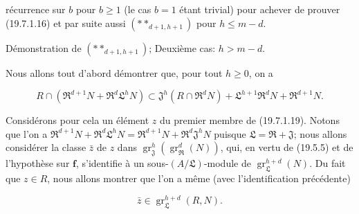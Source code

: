 
récurrence sur $b$ pour $b\geq1$ (le cas $b=1$ étant trivial) pour achever de prouver (19.7.1.16) et par suite aussi $(**_{d+1,h+1})$ pour $h\leq m-d$.

\begin{env}[19.7.1.18]
\label{IV.19.7.1.18}
Démonstration de $(**_{d+1,h+1})$; Deuxième cas: $h>m-d$.
\end{env}

Nous allons tout d'abord démontrer que, pour tout $h\geq0$, on a
\begin{env}[19.7.1.19]
\label{IV.19.7.1.19}
\[
  R\cap(\mathfrak R^{d+1}N+\mathfrak R^d\mathfrak L^hN)\subset\mathfrak J^h(R\cap\mathfrak R^dN)+\mathfrak L^{h+1}\mathfrak R^dN+\mathfrak R^{d+1}N.
\]
\end{env}

Considérons pour cela un élément $z$ du premier membre de (19.7.1.19). Notons que l'on a $\mathfrak R^{d+1}N+\mathfrak R^d\mathfrak L^hN=\mathfrak R^{d+1}N+\mathfrak R^d\mathfrak J^hN$ puisque $\mathfrak L=\mathfrak R+\mathfrak J$; nous allons considérer la classe $\bar z$ de $z$ dans $\operatorname{gr}_{\mathfrak J}^h(\operatorname{gr}_{\mathfrak R}^d(N))$, qui, en vertu de (19.5.5) et de l'hypothèse sur $\mathbf f$, s'identifie à un sous-$(A/\mathfrak L)$-module de $\operatorname{gr}_{\mathfrak L}^{h+d}(N)$. Du fait que $z\in R$, nous allons montrer que l'on a même (avec l'identification précédente)
\begin{env}[19.7.1.20]
\label{IV.19.7.1.20}
\[
  \bar z\in\operatorname{gr}_{\mathfrak L}^{h+d}(R,N).
\]
\end{env}

